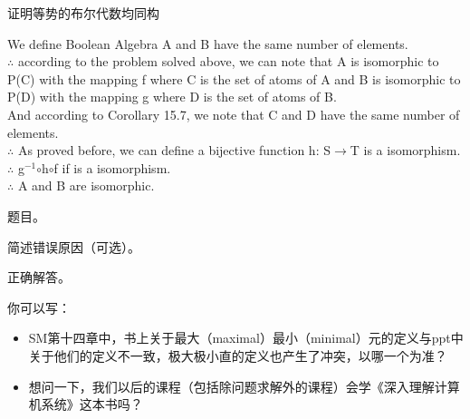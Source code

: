 \documentclass[11pt, a4paper, UTF8]{ctexart}
\begin{document}
\begin{problem}[第三题]
证明等势的布尔代数均同构
\end{problem}
\begin{solution}
We define Boolean Algebra A and B have the same number of elements.\\
$\therefore$ according to the problem solved above, we can note that A is isomorphic to P(C) with the mapping f where C is the set of atoms of A and B is isomorphic to P(D) with the mapping g where D is the set of atoms of B.\\
And according to Corollary 15.7, we note that C and D have the same number of elements. \\
$\therefore$ As proved before, we can define a bijective function h: S$\rightarrow$T is a isomorphism.\\
$\therefore$ g$^{-1}$$\circ$h$\circ$f if is a isomorphism.\\
$\therefore$ A and B are isomorphic.\\

\end{solution}




\begincorrection	%

\begin{problem}[题号]
  题目。
\end{problem}

\begin{cause}
  简述错误原因（可选）。
\end{cause}

\begin{revision}
  正确解答。
\end{revision}
\beginfb	%

你可以写：
\begin{itemize}
\item SM第十四章中，书上关于最大（maximal）最小（minimal）元的定义与ppt中关于他们的定义不一致，极大极小直的定义也产生了冲突，以哪一个为准？\\
\item 想问一下，我们以后的课程（包括除问题求解外的课程）会学《深入理解计算机系统》这本书吗？
\end{itemize}
\end{document}
